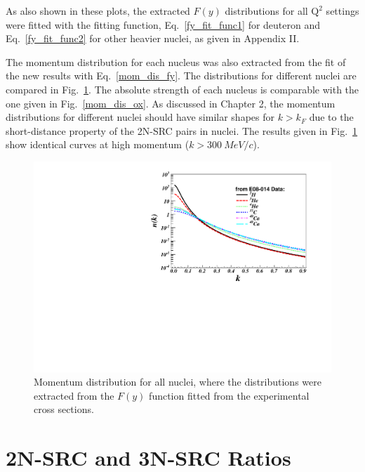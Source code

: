  As also shown in these plots, the extracted $F(y)$ distributions for all $\mathrm{Q^{2}}$ settings were fitted with the fitting function, Eq.~\eqref{fy_fit_func1} for deuteron and Eq.~\eqref{fy_fit_func2} for other heavier nuclei, as given in Appendix II.

 The momentum distribution for each nucleus was also extracted from the fit of the new results with Eq.~\eqref{mom_dis_fy}. The distributions for different nuclei are compared in Fig.~\ref{mom_dis_xgt2}. The absolute strength of each nucleus is comparable with the one given in Fig.~\ref{mom_dis_ox}. As discussed in Chapter 2, the momentum distributions for different nuclei should have similar shapes for $k>k_{F}$ due to the short-distance property of the 2N-SRC pairs in nuclei. The results given in Fig.~\ref{mom_dis_xgt2} show identical curves at high momentum ($k>300~MeV/c$). 
   \begin{figure}[!ht]
  \begin{center}
    \includegraphics[type=pdf,ext=.pdf,read=.pdf,width=1.\textwidth]{./figures/xs/Mom_Dis_XGT2}
    \caption[Momentum distribution for all nuclei]{\footnotesize{Momentum distribution for all nuclei, where the distributions were extracted from the $F(y)$ function fitted from the experimental cross sections.}}
    \label{mom_dis_xgt2}
  \end{center}
\end{figure}

\section{2N-SRC and 3N-SRC Ratios}

